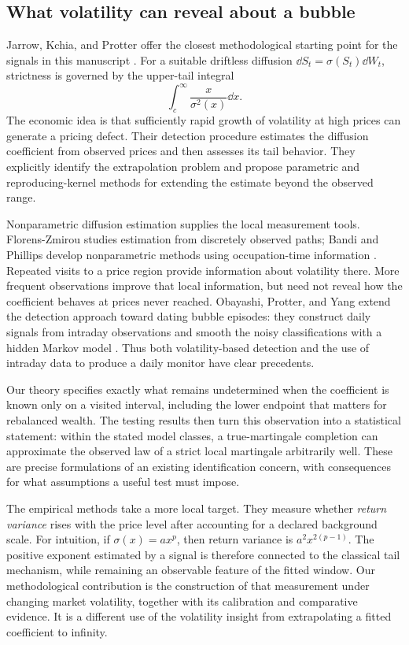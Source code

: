 \subsection{What volatility can reveal about a bubble}
Jarrow, Kchia, and Protter offer the closest methodological starting point
for the signals in this manuscript \cite{jarrow2011detect}. For a suitable
driftless diffusion $\dd S_t=\sigma(S_t)\dd W_t$, strictness is governed by
the upper-tail integral
\[
 \int_c^\infty \frac{x}{\sigma^2(x)}\dd x.
\]
The economic idea is that sufficiently rapid growth of volatility at high
prices can generate a pricing defect. Their detection procedure estimates
the diffusion coefficient from observed prices and then assesses its tail
behavior. They explicitly identify the extrapolation problem and propose
parametric and reproducing-kernel methods for extending the estimate beyond
the observed range.

Nonparametric diffusion estimation supplies the local measurement tools.
Florens-Zmirou studies estimation from discretely observed paths;
Bandi and Phillips develop nonparametric methods using occupation-time
information \cite{florenszmirou1993estimating,bandi2003fully}. Repeated visits
to a price region provide information about volatility there. More frequent
observations improve that local information, but need not reveal how the
coefficient behaves at prices never reached. Obayashi, Protter, and Yang
extend the detection approach toward dating bubble episodes: they construct
daily signals from intraday observations and smooth the noisy classifications
with a hidden Markov model \cite{obayashi2015lifetime}. Thus both
volatility-based detection and the use of intraday data to produce a daily
monitor have clear precedents.

Our theory specifies exactly what remains undetermined when the coefficient
is known only on a visited interval, including the lower endpoint that
matters for rebalanced wealth. The testing results then turn this observation
into a statistical statement: within the stated model classes, a
true-martingale completion can approximate the observed law of a strict
local martingale arbitrarily well. These are precise formulations of an
existing identification concern, with consequences for what assumptions a
useful test must impose.

The empirical methods take a more local target. They measure whether
\emph{return variance} rises with the price level after accounting for a
declared background scale. For intuition, if $\sigma(x)=a x^p$, then return
variance is $a^2x^{2(p-1)}$. The positive exponent estimated by a signal is
therefore connected to the classical tail mechanism, while remaining an
observable feature of the fitted window. Our methodological contribution is
the construction of that measurement under changing market volatility,
together with its calibration and comparative evidence. It is a different
use of the volatility insight from extrapolating a fitted coefficient to
infinity.

